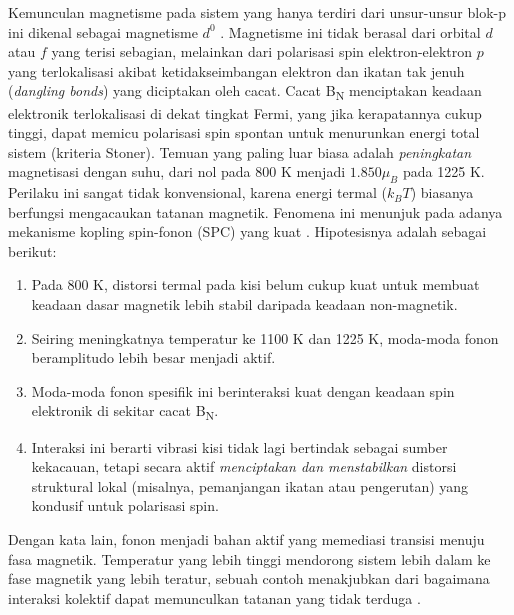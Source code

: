 Kemunculan magnetisme pada sistem yang hanya terdiri dari unsur-unsur blok-p ini dikenal sebagai magnetisme $d^0$ \cite{zhou2019}.
Magnetisme ini tidak berasal dari orbital $d$ atau $f$ yang terisi sebagian, melainkan dari polarisasi spin elektron-elektron $p$ yang terlokalisasi akibat ketidakseimbangan elektron dan ikatan tak jenuh (\emph{dangling bonds}) yang diciptakan oleh cacat.
Cacat B\textsubscript{N} menciptakan keadaan elektronik terlokalisasi di dekat tingkat Fermi, yang jika kerapatannya cukup tinggi, dapat memicu polarisasi spin spontan untuk menurunkan energi total sistem (kriteria Stoner).
Temuan yang paling luar biasa adalah \emph{peningkatan} magnetisasi dengan suhu, dari nol pada 800 K menjadi $1.850 \mu_B$ pada 1225 K. Perilaku ini sangat tidak konvensional, karena energi termal ($k_B T$) biasanya berfungsi mengacaukan tatanan magnetik.
Fenomena ini menunjuk pada adanya mekanisme kopling spin-fonon (SPC) yang kuat \cite{Liu_2025}.
Hipotesisnya adalah sebagai berikut:
\begin{enumerate}
    \item Pada 800 K, distorsi termal pada kisi belum cukup kuat untuk membuat keadaan dasar magnetik lebih stabil daripada keadaan non-magnetik.
\item Seiring meningkatnya temperatur ke 1100 K dan 1225 K, moda-moda fonon beramplitudo lebih besar menjadi aktif.
\item Moda-moda fonon spesifik ini berinteraksi kuat dengan keadaan spin elektronik di sekitar cacat B\textsubscript{N}.
\item Interaksi ini berarti vibrasi kisi tidak lagi bertindak sebagai sumber kekacauan, tetapi secara aktif \emph{menciptakan dan menstabilkan} distorsi struktural lokal (misalnya, pemanjangan ikatan atau pengerutan) yang kondusif untuk polarisasi spin.
\end{enumerate}
Dengan kata lain, fonon menjadi bahan aktif yang memediasi transisi menuju fasa magnetik.
Temperatur yang lebih tinggi mendorong sistem lebih dalam ke fase magnetik yang lebih teratur, sebuah contoh menakjubkan dari bagaimana interaksi kolektif dapat memunculkan tatanan yang tidak terduga \cite{Pantazopoulos2024}.


